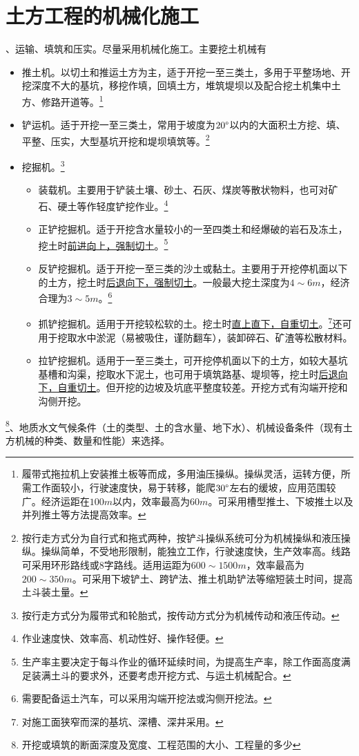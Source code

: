 \documentclass{book}
\begin{document}
\section{土方工程的机械化施工}
、运输、填筑和压实。尽量采用机械化施工。主要挖土机械有
\begin{itemize}
    \item 推土机。以切土和推运土方为主，适于开挖一至三类土，多用于平整场地、开挖深度不大的基坑，移挖作填，回填土方，堆筑堤坝以及配合挖土机集中土方、修路开道等。\footnote{履带式拖拉机上安装推土板等而成，多用油压操纵。操纵灵活，运转方便，所需工作面较小，行驶速度快，易于转移，能爬$30\degree$左右的缓坡，应用范围较广。经济运距在$100m$以内，效率最高为$60m$。可采用槽型推土、下坡推土以及并列推土等方法提高效率。}
    \item 铲运机。适于开挖一至三类土，常用于坡度为$20\degree$以内的大面积土方挖、填、平整、压实，大型基坑开挖和堤坝填筑等。\footnote{按行走方式分为自行式和拖式两种，按铲斗操纵系统可分为机械操纵和液压操纵。操纵简单，不受地形限制，能独立工作，行驶速度快，生产效率高。线路可采用环形路线或$8$字路线。适用运距为$600\sim1500m$，效率最高为$200\sim350m$。可采用下坡铲土、跨铲法、推土机助铲法等缩短装土时间，提高土斗装土量。}
    \item 挖掘机。\footnote{按行走方式分为履带式和轮胎式，按传动方式分为机械传动和液压传动。}
          \begin{itemize}
              \item 装载机。主要用于铲装土壤、砂土、石灰、煤炭等散状物料，也可对矿石、硬土等作轻度铲挖作业。\footnote{作业速度快、效率高、机动性好、操作轻便。}
              \item 正铲挖掘机。适于开挖含水量较小的一至四类土和经爆破的岩石及冻土，挖土时\underline{前进向上，强制切土}。\footnote{生产率主要决定于每斗作业的循环延续时间，为提高生产率，除工作面高度满足装满土斗的要求外，还要考虑开挖方式、与运土机械配合。}
              \item 反铲挖掘机。适于开挖一至三类的沙土或黏土。主要用于开挖停机面以下的土方，挖土时\underline{后退向下，强制切土}。一般最大挖土深度为$4\sim6m$，经济合理为$3\sim5m$。\footnote{需要配备运土汽车，可以采用沟端开挖法或沟侧开挖法。}
              \item 抓铲挖掘机。适用于开挖较松软的土。挖土时\underline{直上直下，自重切土}。\footnote{对施工面狭窄而深的基坑、深槽、深井采用。}还可用于挖取水中淤泥（易被吸住，谨防翻车），装卸碎石、矿渣等松散材料。
              \item 拉铲挖掘机。适用于一至三类土，可开挖停机面以下的土方，如较大基坑基槽和沟渠，挖取水下泥土，也可用于填筑路基、堤坝等，挖土时\underline{后退向下，自重切土}。但开挖的边坡及坑底平整度较差。开挖方式有沟端开挖和沟侧开挖。
          \end{itemize}
\end{itemize}
\footnote{开挖或填筑的断面深度及宽度、工程范围的大小、工程量的多少}、地质水文气候条件（土的类型、土的含水量、地下水）、机械设备条件（现有土方机械的种类、数量和性能）来选择。
\end{document}

